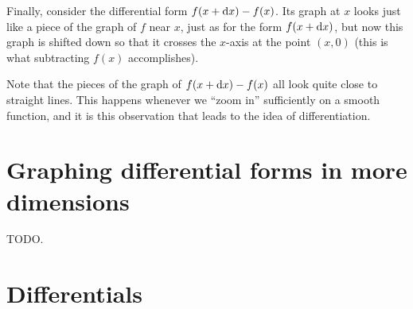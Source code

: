 Finally, consider the differential form $f(x+{\mathrm{d} x})-f(x)$.
Its graph at $x$ looks just like a piece of the graph of $f$ near $x$, just as for the form $f(x+{\mathrm{d} x})$, but now this graph is shifted down so that it crosses the $x$-axis at the point $(x,0)$ (this is what subtracting $f(x)$ accomplishes).
\begin{center}
\end{center}
Note that the pieces of the graph of $f(x+{\mathrm{d} x})-f(x)$ all look quite close to straight lines.
This happens whenever we ``zoom in'' sufficiently on a smooth function, and it is this observation that leads to the idea of differentiation.

\section{Graphing differential forms in more dimensions}
\label{sec:graphing-higher-dim}

TODO.

\section{Differentials}
\label{sec:differentials}

